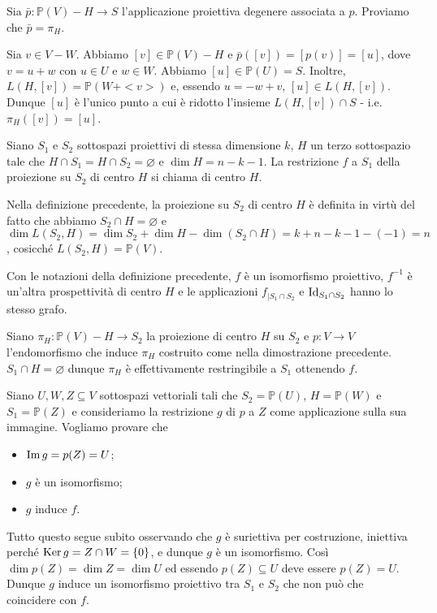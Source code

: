 	\par Sia $\bar{p}: \mathbb{P}(V) - H \rightarrow S$ l'applicazione proiettiva degenere associata a $p$. Proviamo che $\bar{p} = \pi_H$.
	\par Sia $v \in V - W$. Abbiamo $[v] \in \mathbb{P}(V) - H$ e $\bar{p}([v]) = [p(v)] = [u]$, dove $v = u + w$ con $u \in U$ e $w \in W$. Abbiamo $[u] \in \mathbb{P}(U) = S$. Inoltre, $L(H, [v]) = \mathbb{P}(W + <v>)$ e, essendo $u = - w + v$, $[u] \in L(H, [v])$. Dunque $[u]$ \`e l'unico punto a cui \`e ridotto l'insieme $L(H, [v]) \cap S$ - i.e. $\pi_H([v]) = [u]$. \EndProof
\begin{Definition}\label{def13}
	Siano $S_1$ e $S_2$ sottospazi proiettivi di stessa dimensione $k$, $H$ un terzo sottospazio tale che $H \cap S_1 = H \cap S_2 = \varnothing$ e $\dim H = n - k - 1$. La restrizione $f$ a $S_1$ della proiezione su $S_2$ di centro $H$ si chiama  di centro $H$.
\end{Definition}
	\par Nella definizione precedente, la proiezione su $S_2$ di centro $H$ \`e definita in virt\`u del fatto che abbiamo $S_2 \cap H = \varnothing$ e $\dim L(S_2, H) = \dim S_2 + \dim H - \dim(S_2 \cap H) = k + n - k - 1 - (-1) = n$, cosicch\'e $L(S_2, H) = \mathbb{P}(V)$.
\begin{Theorem}\label{th12}
	Con le notazioni della definizione precedente, $f$ \`e un isomorfismo proiettivo, $f^{-1}$ \`e un'altra prospettivit\`a di centro $H$ e le applicazioni $f_{|S_1 \cap S_2}$ e $\Identity_{S_1 \cap S_2}$ hanno lo stesso grafo.
\end{Theorem}
\Proof Siano $\pi_H: \mathbb{P}(V) - H \rightarrow S_2$ la proiezione di centro $H$ su $S_2$ e $p: V \rightarrow V$ l'endomorfismo che induce $\pi_H$ costruito come nella dimostrazione precedente. $S_1 \cap H = \varnothing$ dunque $\pi_H$ \`e effettivamente restringibile a $S_1$ ottenendo $f$.
	\par Siano $U, W, Z \subseteq V$ sottospazi vettoriali tali che $S_2 = \mathbb{P}(U)$, $H = \mathbb{P}(W)$ e $S_1 = \mathbb{P}(Z)$ e consideriamo la restrizione $g$ di $p$ a $Z$ come applicazione sulla sua immagine. Vogliamo provare che
\begin{itemize}
	\item $\operatorname{Im} g = p(Z) = U$;
	\item $g$ \`e un isomorfismo;
	\item $g$ induce $f$.
\end{itemize}
	\par Tutto questo segue subito osservando che $g$ \`e suriettiva per costruzione, iniettiva perch\'e $\operatorname{Ker} g = Z \cap W = \lbrace 0 \rbrace$, e dunque $g$ \`e un isomorfismo. Cos\`i $\dim p(Z) = \dim Z = \dim U$ ed essendo $p(Z) \subseteq U$ deve essere $p(Z) = U$. Dunque $g$ induce un isomorfismo proiettivo tra $S_1$ e $S_2$ che non pu\`o che coincidere con $f$.
